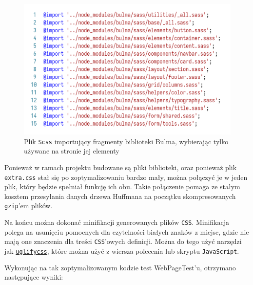\documentclass[licencjacka]{pracadypl}
\begin{document}
\begin{figure}[H]
  \centering
  \includegraphics[width=\linewidth/\real{1.5}]{images/code-scss-import-bulma.png}
  \caption{Plik \texttt{Scss} importujący fragmenty biblioteki Bulma, wybierając tylko używane na stronie jej elementy}
  \label{fig:code-scss-import-bulma}
\end{figure}

Ponieważ w ramach projektu budowane są pliki biblioteki, oraz ponieważ plik \texttt{extra.css} stał się po zoptymalizowaniu bardzo mały, można połączyć je w jeden plik, który będzie spełniał funkcję ich obu. Takie połączenie pomaga ze stałym kosztem przesyłania danych drzewa Huffmana na początku skompresowanych \texttt{gzip}'em plików.

Na końcu można dokonać minifikacji generowanych plików \texttt{CSS}. Minifikacja polega na usunięciu pomocnych dla czytelności białych znaków z miejsc, gdzie nie mają one znaczenia dla treści \texttt{CSS}'owych definicji. Można do tego użyć narzędzi jak \href{https://www.npmjs.com/package/uglifycss}{\texttt{uglifycss}}, które można użyć z wiersza polecenia lub skryptu \texttt{JavaScript}.

Wykonując na tak zoptymalizowanym kodzie test WebPageTest'u, otrzymano następujące wyniki:
\end{document}
